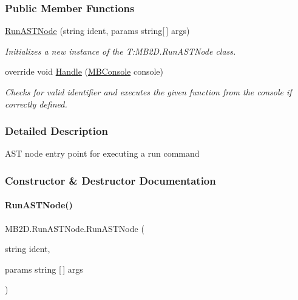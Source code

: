 \subsubsection*{Public Member Functions}
\begin{DoxyCompactItemize}
\item 
\hyperlink{class_m_b2_d_1_1_run_a_s_t_node_a6be1d2f2ae20f5fffefb414c40d15c70}{Run\+A\+S\+T\+Node} (string ident, params string\mbox{[}$\,$\mbox{]} args)
\begin{DoxyCompactList}\small\item\em Initializes a new instance of the T\+:\+M\+B2\+D.\+Run\+A\+S\+T\+Node class. \end{DoxyCompactList}\item 
override void \hyperlink{class_m_b2_d_1_1_run_a_s_t_node_a20845d86608c81357f4347c29dcaf2c8}{Handle} (\hyperlink{class_m_b2_d_1_1_m_b_console}{M\+B\+Console} console)
\begin{DoxyCompactList}\small\item\em Checks for valid identifier and executes the given function from the console if correctly defined. \end{DoxyCompactList}\end{DoxyCompactItemize}


\subsubsection{Detailed Description}
A\+ST node entry point for executing a run command 



\subsubsection{Constructor \& Destructor Documentation}
\hypertarget{class_m_b2_d_1_1_run_a_s_t_node_a6be1d2f2ae20f5fffefb414c40d15c70}{}\label{class_m_b2_d_1_1_run_a_s_t_node_a6be1d2f2ae20f5fffefb414c40d15c70} 
\paragraph{\texorpdfstring{Run\+A\+S\+T\+Node()}{RunASTNode()}}
{\footnotesize\ttfamily M\+B2\+D.\+Run\+A\+S\+T\+Node.\+Run\+A\+S\+T\+Node (\begin{DoxyParamCaption}\item[{string}]{ident,  }\item[{params string \mbox{[}$\,$\mbox{]}}]{args }\end{DoxyParamCaption})\hspace{0.3cm}{\ttfamily [inline]}}



